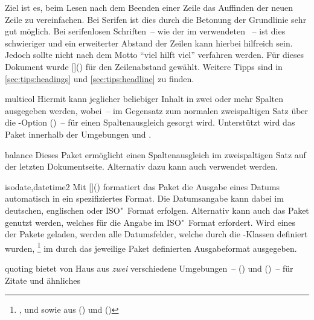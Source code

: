 \begin{packages}
  Ziel ist es, beim Lesen nach dem Beenden einer Zeile das Auffinden der neuen 
  Zeile zu vereinfachen. Bei Serifen ist dies durch die Betonung der Grundlinie 
  sehr gut möglich. Bei serifenlosen Schriften~-- wie der im \TUDCD verwendeten 
  \OpenSans~-- ist dies schwieriger und ein erweiterter Abstand der Zeilen kann 
  hierbei hilfreich sein. Jedoch sollte nicht nach dem Motto 
  \enquote{viel hilft viel} verfahren werden. Für dieses Dokument wurde 
  [\MPValue{\baselinestretch}]() für den 
  Zeilenabstand gewählt. Weitere Tipps sind in \autoref{sec:tips:headings} und 
  \autoref{sec:tips:headline} zu finden.
\item[multicol]
  Hiermit kann jeglicher beliebiger Inhalt in zwei oder mehr Spalten ausgegeben 
  werden, wobei~-- im Gegensatz zum normalen zweispaltigen Satz über die
  \KOMAScript-Option ()~-- für einen 
  Spaltenausgleich gesorgt wird. Unterstützt wird das Paket innerhalb der 
  Umgebungen  und .
\item[balance]
  Dieses Paket ermöglicht einen Spaltenausgleich im zweispaltigen Satz auf der 
  letzten Dokumentseite. Alternativ dazu kann auch  verwendet 
  werden.
\item[isodate,datetime2]
  Mit []() formatiert das 
  Paket  die Ausgabe eines Datums automatisch in ein 
  spezifiziertes Format. Die Datumsangabe kann dabei im deutschen, englischen 
  oder ISO"~Format erfolgen. Alternativ kann auch das Paket 
  genutzt werden, welches für  die Angabe im 
  ISO"~Format erfordert. Wird eines der Pakete geladen, werden alle Datumsfelder, 
  welche durch die \TUDScript-Klassen definiert wurden,%
  \footnote{%
    ,  und  sowie aus 
     () und 
    ()%
  }
  im durch das jeweilige Paket definierten Ausgabeformat ausgegeben.
\item[quoting]
   bietet von Haus aus \emph{zwei} verschiedene Umgebungen~-- 
  () und 
  ()~-- für Zitate und ähnliches 

\end{packages}
